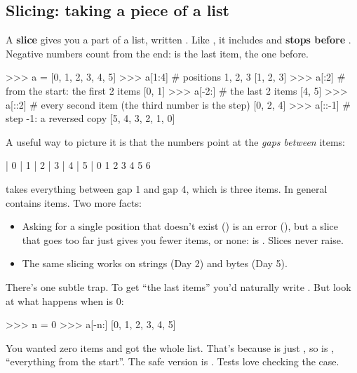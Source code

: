 \documentclass[10pt,a4paper]{article}
\begin{document}
\subsection{Slicing: taking a piece of a list}
A \textbf{slice} gives you a part of a list, written . Like , it includes  and \textbf{stops before} . Negative numbers count from the end:  is the last item,  the one before.
\begin{txtcode}
>>> a = [0, 1, 2, 3, 4, 5]
>>> a[1:4]       # positions 1, 2, 3
[1, 2, 3]
>>> a[:2]        # from the start: the first 2 items
[0, 1]
>>> a[-2:]       # the last 2 items
[4, 5]
>>> a[::2]       # every second item (the third number is the step)
[0, 2, 4]
>>> a[::-1]      # step -1: a reversed copy
[5, 4, 3, 2, 1, 0]
\end{txtcode}
A useful way to picture it is that the numbers point at the \emph{gaps between} items:
\begin{txtcode}
  | 0 | 1 | 2 | 3 | 4 | 5 |
  0   1   2   3   4   5   6
\end{txtcode}
 takes everything between gap 1 and gap 4, which is three items. In general  contains  items.
Two more facts:
\begin{itemize}
\item Asking for a single position that doesn’t exist () is an error (), but a slice that goes too far just gives you fewer items, or none:  is \code{[]}. Slices never raise.
\item The same slicing works on strings (Day 2) and bytes (Day 5).
\end{itemize}
There’s one subtle trap. To get “the last  items” you’d naturally write . But look at what happens when  is 0:
\begin{txtcode}
>>> n = 0
>>> a[-n:]
[0, 1, 2, 3, 4, 5]
\end{txtcode}
You wanted zero items and got the whole list. That’s because  is just , so  is , “everything from the start”. The safe version is . Tests love checking the  case.
\end{document}

